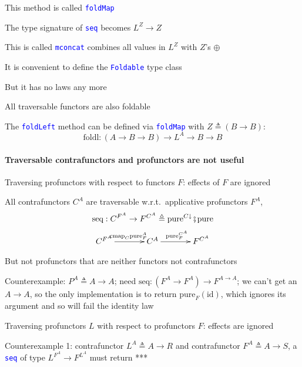This method is called \texttt{\textcolor{blue}{\footnotesize{}foldMap}} 

The type signature of \texttt{\textcolor{blue}{\footnotesize{}seq}}
becomes $L^{Z}\rightarrow Z$

This is called \texttt{\textcolor{blue}{\footnotesize{}mconcat}} \textendash{}
combines all values in $L^{Z}$ with $Z$\textsf{'}s $\oplus$

It is convenient to define the \texttt{\textcolor{blue}{\footnotesize{}Foldable}}
type class

But it has no laws any more

All traversable functors are also foldable

The \texttt{\textcolor{blue}{\footnotesize{}foldLeft}} method can
be defined via \texttt{\textcolor{blue}{\footnotesize{}foldMap}} with
$Z\triangleq(B\rightarrow B)$:
\[
\text{foldl}:\left(A\rightarrow B\rightarrow B\right)\rightarrow L^{A}\rightarrow B\rightarrow B
\]


\paragraph{Traversable contrafunctors and profunctors are not useful}

Traversing profunctors with respect to functors $F$: effects of $F$
are ignored

All contrafunctors $C^{A}$ are traversable w.r.t.~applicative profunctors
$F^{A}$,{\footnotesize{}
\[
\text{seq}:C^{F^{A}}\rightarrow F^{C^{A}}\triangleq\text{pure}^{C\downarrow}\bef\text{pure}
\]
\[
\xymatrix{C^{F^{A}}\ar[r]\sp(0.5){\text{cmap}_{C}\text{pure}_{F}^{A}}\xyScaleY{0.2pc}\xyScaleX{3pc} & C^{A}\ar[r]\sp(0.5){\text{pure}_{F}^{C^{A}}} & F^{C^{A}}}
\]
}{\footnotesize\par}

But not profunctors that are neither functors not contrafunctors

Counterexample: $P^{A}\triangleq A\rightarrow A$; need $\text{seq}:\left(F^{A}\rightarrow F^{A}\right)\rightarrow F^{A\rightarrow A}$;
we can't get an $A\rightarrow A$, so the only implementation is to
return $\text{pure}_{F}\left(\text{id}\right)$, which ignores its
argument and so will fail the identity law 

Traversing profunctors $L$ with respect to profunctors $F$: effects
are ignored

Counterexample 1: contrafunctor $L^{A}\triangleq A\rightarrow R$
and contrafunctor $F^{A}\triangleq A\rightarrow S$, a \texttt{\textcolor{blue}{\footnotesize{}seq}}
of type $L^{F^{A}}\rightarrow F^{L^{A}}$ must return {*}{*}{*}


